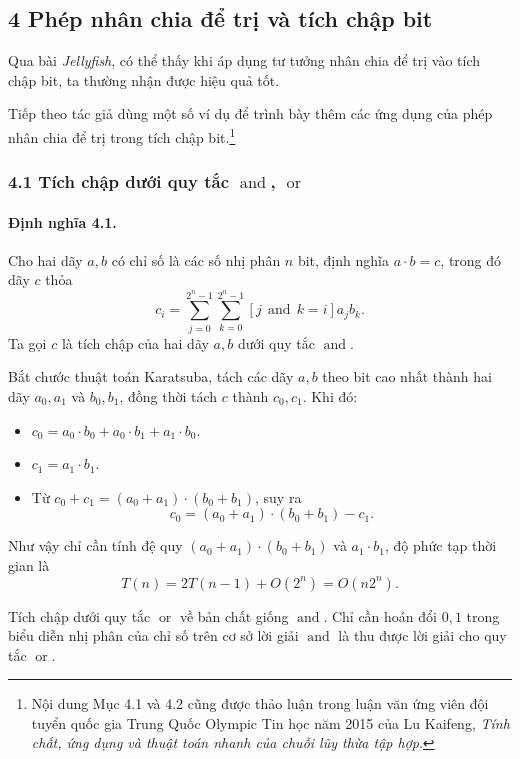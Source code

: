 \documentclass[11pt]{article}
\begin{document}
\subsection*{4 Phép nhân chia để trị và tích chập bit}

Qua bài \emph{Jellyfish}, có thể thấy khi áp dụng tư tưởng nhân chia để trị vào
tích chập bit, ta thường nhận được hiệu quả tốt.

Tiếp theo tác giả dùng một số ví dụ để trình bày thêm các ứng dụng của phép
nhân chia để trị trong tích chập bit.\footnote{Nội dung Mục 4.1 và 4.2 cũng
được thảo luận trong luận văn ứng viên đội tuyển quốc gia Trung Quốc Olympic
Tin học năm 2015 của Lu Kaifeng, \emph{Tính chất, ứng dụng và thuật toán nhanh
của chuỗi lũy thừa tập hợp}.}

\subsubsection*{4.1 Tích chập dưới quy tắc \texorpdfstring{\(\operatorname{and}\)}{and}, \texorpdfstring{\(\operatorname{or}\)}{or}}

\paragraph{Định nghĩa 4.1.}
Cho hai dãy \(a,b\) có chỉ số là các số nhị phân \(n\) bit, định nghĩa
\(a\cdot b=c\), trong đó dãy \(c\) thỏa
\[
  c_i=\sum_{j=0}^{2^n-1}\sum_{k=0}^{2^n-1}
  [j\operatorname{\,and\,}k=i]a_jb_k.
\]
Ta gọi \(c\) là tích chập của hai dãy \(a,b\) dưới quy tắc
\(\operatorname{and}\).

Bắt chước thuật toán Karatsuba, tách các dãy \(a,b\) theo bit cao nhất thành
hai dãy \(a_0,a_1\) và \(b_0,b_1\), đồng thời tách \(c\) thành \(c_0,c_1\).
Khi đó:
\begin{itemize}
  \item \(c_0=a_0\cdot b_0+a_0\cdot b_1+a_1\cdot b_0\).
  \item \(c_1=a_1\cdot b_1\).
  \item Từ \(c_0+c_1=(a_0+a_1)\cdot(b_0+b_1)\), suy ra
  \[
    c_0=(a_0+a_1)\cdot(b_0+b_1)-c_1.
  \]
\end{itemize}

Như vậy chỉ cần tính đệ quy \((a_0+a_1)\cdot(b_0+b_1)\) và \(a_1\cdot b_1\),
độ phức tạp thời gian là
\[
  T(n)=2T(n-1)+O(2^n)=O(n2^n).
\]

Tích chập dưới quy tắc \(\operatorname{or}\) về bản chất giống
\(\operatorname{and}\). Chỉ cần hoán đổi \(0,1\) trong biểu diễn nhị phân của
chỉ số trên cơ sở lời giải \(\operatorname{and}\) là thu được lời giải cho
quy tắc \(\operatorname{or}\).
\end{document}

